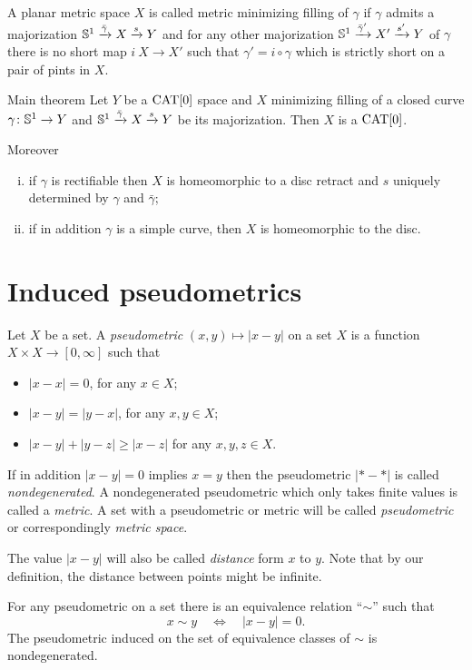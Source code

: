 \documentclass{article}
\begin{document}
A planar metric space $X$ is called metric minimizing filling of $\gamma$ if
$\gamma$ admits a majorization $\mathbb{S}^1\xrightarrow{\bar\gamma}X\xrightarrow{s}Y$
and for any other majorization $\mathbb{S}^1\xrightarrow{\bar\gamma'}X'\xrightarrow{s'}Y$ of $\gamma$
there is no short map $i\:X\to X'$ such that $\gamma'=i\circ\gamma$ which is strictly short on a pair of pints in $X$. 

\begin{thm}{Main theorem}\label{thm:mainintro}
Let $Y$ be a $\mathop{\rm CAT}\nolimits[0]$ space and $X$ minimizing filling of a closed curve $\gamma\colon\mathbb{S}^1\to Y$
and $\mathbb{S}^1\xrightarrow{\bar\gamma}X\xrightarrow{s}Y$ be its majorization.
Then $X$ is a $\mathop{\rm CAT}\nolimits[0]$. 

Moreover
\begin{enumerate}[(i)]
\item if $\gamma$ is rectifiable then $X$ is homeomorphic to a disc retract
and $s$ uniquely determined by $\gamma$ and $\bar\gamma$;
\item if in addition $\gamma$ is a simple curve, then $X$ is homeomorphic to the disc.
\end{enumerate}
\end{thm}

\section{Induced  pseudometrics}\label{sec:Def}

Let $X$ be a set.
A \emph{pseudometric} $(x,y)\mapsto |x-y|$ on a set $X$ 
is a function $X\times X\to[0,\infty]$
such that 
\begin{itemize}
\item $|x-x|=0$, for any $x\in X$;
\item $|x-y|=|y-x|$, for any $x,y\in X$;
\item $|x-y|+|y-z|\ge|x-z|$ for any  $x,y,z\in X$.
\end{itemize}
If in addition $|x-y|=0$ implies $x=y$ then the pseudometric $|{*}-{*}|$ is called \emph{nondegenerated}.
A nondegenerated pseudometric which only takes finite values is called a \emph{metric}. 
A set with a pseudometric or metric will be called \emph{pseudometric} or correspondingly \emph{metric space}.

The value $|x-y|$ will also be called \emph{distance} form $x$ to $y$.
Note that by our definition, the distance between points might be infinite.

For any pseudometric on a set there is an equivalence relation ``$\sim$'' such that 
\[x\sim y\quad\iff\quad|x-y|=0.\]
The pseudometric induced  on the set of equivalence classes of $\sim$ is nondegenerated.
\end{document}
